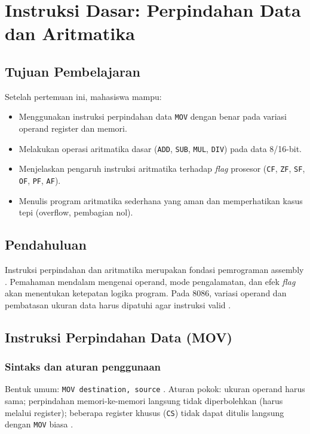 \chapter{Instruksi Dasar: Perpindahan Data dan Aritmatika}

\section{Tujuan Pembelajaran}
Setelah pertemuan ini, mahasiswa mampu:
\begin{itemize}
    \item Menggunakan instruksi perpindahan data \texttt{MOV} dengan benar pada variasi operand register dan memori.
    \item Melakukan operasi aritmatika dasar (\texttt{ADD}, \texttt{SUB}, \texttt{MUL}, \texttt{DIV}) pada data 8/16-bit.
    \item Menjelaskan pengaruh instruksi aritmatika terhadap \textit{flag} prosesor (\texttt{CF}, \texttt{ZF}, \texttt{SF}, \texttt{OF}, \texttt{PF}, \texttt{AF}).
    \item Menulis program aritmatika sederhana yang aman dan memperhatikan kasus tepi (overflow, pembagian nol).
\end{itemize}

\section{Pendahuluan}
Instruksi perpindahan dan aritmatika merupakan fondasi pemrograman assembly \cite{susanto1995belajar}. Pemahaman mendalam mengenai operand, mode pengalamatan, dan efek \textit{flag} akan menentukan ketepatan logika program. Pada 8086, variasi operand dan pembatasan ukuran data harus dipatuhi agar instruksi valid \cite{hyde2010art}.

\section{Instruksi Perpindahan Data (MOV)}
\subsection{Sintaks dan aturan penggunaan}
Bentuk umum: \texttt{MOV destination, source} \cite{hyde2010art}. Aturan pokok: ukuran operand harus sama; perpindahan memori-ke-memori langsung tidak diperbolehkan (harus melalui register); beberapa register khusus (\texttt{CS}) tidak dapat ditulis langsung dengan \texttt{MOV} biasa \cite{susanto1995belajar}.

